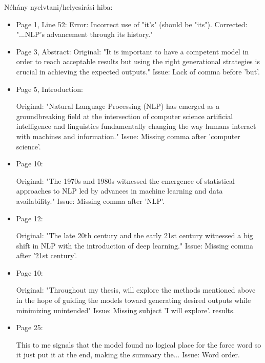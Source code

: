 \documentclass[a4paper,12pt]{article}
\begin{document}
\alairas

\newpage
Néhány nyelvtani/helyesírási hiba:

\begin{itemize}

\item Page 1, Line 52:
Error: Incorrect use of "it's" (should be "its").
Corrected: "...NLP’s advancement through its history."

    \item Page 3, Abstract:
Original:  "It is important to have a competent model in order to reach acceptable results but using the right generational strategies is crucial in achieving the expected outputs."
Issue: Lack of comma before 'but'.

    \item Page 5, Introduction:

Original: "Natural Language Processing (NLP) has emerged as a groundbreaking field at the intersection of computer science artificial intelligence and linguistics fundamentally changing the way humans interact with machines and information."
Issue: Missing comma after 'computer science'.

    \item Page 10:

Original: "The 1970s and 1980s witnessed the emergence of statistical approaches to NLP led by advances in machine learning and data availability."
Issue: Missing comma after 'NLP'.
    \item Page 12:

Original: "The late 20th century and the early 21st century witnessed a big shift in NLP with the introduction of deep learning."
Issue: Missing comma after '21st century'.

    \item Page 10:
    
Original: "Throughout my thesis, will explore the methods mentioned above in the hope of
guiding the models toward generating desired outputs while minimizing unintended"
Issue: Missing subject 'I will explore'.
results.
    \item Page 25:
    
This to me signals that the model found no logical place for the
force word so it just put it at the end, making the summary the...
Issue: Word order.











\end{itemize}
\end{document}
